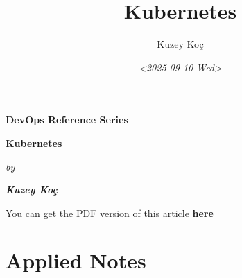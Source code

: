 \documentclass[14pt]{article}
\author{Kuzey Koç}
\date{\textit{<2025-09-10 Wed>}}
\title{Kubernetes}
\let\oldhref\href
\renewcommand{\href}[2]{\oldhref{#1}{\textbf{#2}}}
\begin{document}
\tableofcontents



\begin{titlepage}
  \BgThispage
  \color{covertext}
  \centering
  \vspace*{3cm}
  {\fontsize{25pt}{35pt}\bfseries DevOps Reference Series \par}
  \vspace{0.5cm}
  {\fontsize{60pt}{72pt}\bfseries Kubernetes \par}
  \vspace{1cm}
  {\fontsize{18pt}{20pt}\itshape by \par}
  \vspace{0.5cm}
  {\fontsize{23pt}{27pt}\itshape{\bfseries Kuzey Koç} \par}
  \vfill
\end{titlepage}

\color{gruv-fg}

\newpage
\tableofcontents
\newpage

You can get the PDF version of this article \href{file:///home/savolla/project/publishing/savolla.github.io/content/reference/kubernetes/index.pdf}{here} 📎
\section*{Applied Notes}
\label{sec:orge0c303e}
\end{document}
